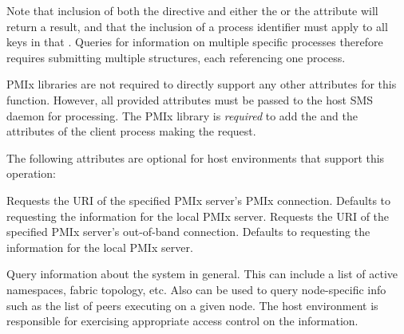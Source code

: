 Note that inclusion of both the  directive and either the  or the  attribute will return a  result, and that the inclusion of a process identifier must apply to all keys in that . Queries for information on multiple specific processes therefore requires submitting multiple  structures, each referencing one process.

\ac{PMIx} libraries are not required to directly support any other attributes for this function. However, all provided attributes must be passed to the host \ac{SMS} daemon for processing. The \ac{PMIx} library is \textit{required} to add the  and the  attributes of the client process making the request.

\reqattrend


\optattrstart
The following attributes are optional for host environments that support this operation:

 Requests the URI of the specified \ac{PMIx} server's \ac{PMIx} connection. Defaults to requesting the information for the local \ac{PMIx} server.
\pasteAttributeItemEnd
{} Requests the URI of the specified \ac{PMIx} server's out-of-band connection. Defaults to requesting the information for the local \ac{PMIx} server.
\pasteAttributeItemEnd

\optattrend

\descr

Query information about the system in general.
This can include a list of active namespaces, fabric topology, etc.
Also can be used to query node-specific info such as the list of peers executing on a given node. The host environment is responsible for exercising appropriate access control on the information.


